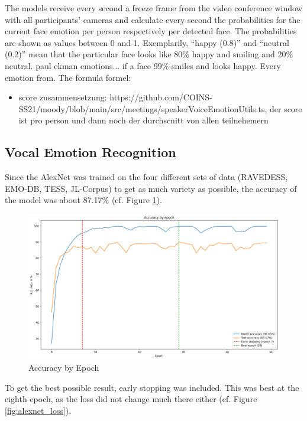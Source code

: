The models receive every second a freeze frame from the video conference window with all participants' cameras and calculate every second the probabilities for the current face emotion per person respectively per detected face. The probabilities are shown as values between 0 and 1. Exemplarily, ``happy (0.8)'' and ``neutral (0.2)'' mean that the particular face looks like 80\% happy and smiling and 20\% neutral. paul ekman emotions...
 if a face 99\% smiles and looks happy. Every emotion from. The formula 
formel:
\begin{itemize}
\item score zusammensetzung: https://github.com/COINS-SS21/moody/blob/main/src/meetings/speakerVoiceEmotionUtils.ts, der score ist pro person und dann noch der durchscnitt von allen teilnehemern
\end{itemize}

\subsection{Vocal Emotion Recognition}
\label{subsec:results_vocal_emotion_recognition}
Since the AlexNet was trained on the four different sets of data (RAVEDESS, EMO-DB, TESS, JL-Corpus) to get as much variety as possible, the accuracy of the model was about 87.17\% (cf. Figure \ref{fig:alexnet_accuracy}). 

\begin{figure}
\centering
\includegraphics[width=1\textwidth]{assets/alexnet_accuracy.png}
\caption{Accuracy by Epoch}
\label{fig:alexnet_accuracy}
\end{figure}

To get the best possible result, early stopping was included. This was best at the eighth epoch, as the loss did not change much there either (cf. Figure \ref{fig:alexnet_loss}).

